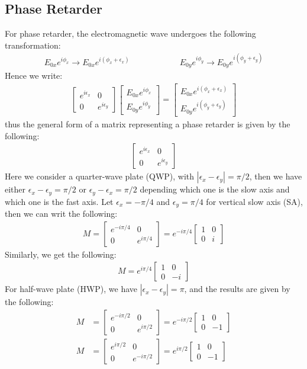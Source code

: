 \documentclass[11pt]{book}
\theoremstyle{break}
\theoremstyle{break}
\newcommand{\bmat}[1]{\begin{bmatrix} #1 \end{bmatrix}}
\begin{document}
\subsection{Phase Retarder}
For phase retarder, the electromagnetic wave undergoes the following transformation:
\begin{align*}
E_{0x}e^{i\phi_x} \to E_{0x} e^{i(\phi_x + \epsilon_x)}\qquad\qquad\qquad E_{0y}e^{i\phi_y} \to E_{0y}e^{i(\phi_y + \epsilon_y)}
\end{align*}
Hence we write:
\begin{align*}
\bmat{e^{i\epsilon_x} & 0 \\ 0 & e^{i\epsilon_y}} \bmat{E_{0x}e^{i\phi_x}\\E_{0y}e^{i\phi_y}} = \bmat{E_{0x}e^{i(\phi_x + \epsilon_x)}\\E_{0y}e^{i(\phi_y + \epsilon_y)}}
\end{align*}
thus the general form of a matrix representing a phase retarder is given by the following:
\begin{align*}
\bmat{e^{i\epsilon_x} & 0 \\ 0 & e^{i\epsilon_y}} \tag{phase retarder}
\end{align*}
Here we consider a quarter-wave plate (QWP), with $|\epsilon_x - \epsilon_y| = \pi/2$, then we have either $\epsilon_x - \epsilon_y = \pi/2$ or $\epsilon_y - \epsilon_x = \pi/2$ depending which one is the slow axis and which one is the fast axis. Let $\epsilon_x = -\pi/4$ and $\epsilon_y = \pi/4$ for vertical slow axis (SA), then we can writ the following:
\begin{align*}
M = \bmat{e^{-i\pi/4} &0 \\ 0 & e^{i\pi/4}} = e^{-i\pi/4}\bmat{1 & 0 \\ 0 &i} \tag{QWP, SA vertical}
\end{align*}
Similarly, we get the following:
\begin{align*}
M = e^{i\pi/4}\bmat{1 & 0 \\ 0 & -i} \tag{QWP, SA horizontal}
\end{align*}
For half-wave plate (HWP), we have $|\epsilon_x - \epsilon_y | = \pi$, and the results are given by the following:
\begin{align*}
M &= \bmat{e^{-i\pi/2} & 0 \\ 0 & e^{i\pi/2}} = e^{-i\pi/2}\bmat{1 & 0 \\ 0 & -1} \tag{HWP, SA vertical}\\
M &= \bmat{e^{i\pi/2} & 0 \\ 0 & e^{-i\pi/2}} = e^{i\pi/2}\bmat{1 & 0 \\ 0 & -1} \tag{HWP, SA horizontal}
\end{align*}
\end{document}
